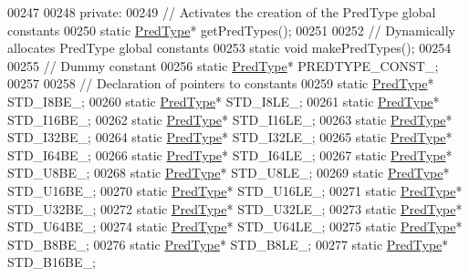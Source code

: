 \begin{DoxyCode}
00247 
00248    \textcolor{keyword}{private}:
00249         \textcolor{comment}{// Activates the creation of the PredType global constants}
00250         \textcolor{keyword}{static} \hyperlink{class_h5_1_1_pred_type}{PredType}* getPredTypes();
00251 
00252         \textcolor{comment}{// Dynamically allocates PredType global constants}
00253         \textcolor{keyword}{static} \textcolor{keywordtype}{void} makePredTypes();
00254 
00255         \textcolor{comment}{// Dummy constant}
00256         \textcolor{keyword}{static} \hyperlink{class_h5_1_1_pred_type}{PredType}* PREDTYPE\_CONST\_;
00257 
00258         \textcolor{comment}{// Declaration of pointers to constants}
00259         \textcolor{keyword}{static} \hyperlink{class_h5_1_1_pred_type}{PredType}* STD\_I8BE\_;
00260         \textcolor{keyword}{static} \hyperlink{class_h5_1_1_pred_type}{PredType}* STD\_I8LE\_;
00261         \textcolor{keyword}{static} \hyperlink{class_h5_1_1_pred_type}{PredType}* STD\_I16BE\_;
00262         \textcolor{keyword}{static} \hyperlink{class_h5_1_1_pred_type}{PredType}* STD\_I16LE\_;
00263         \textcolor{keyword}{static} \hyperlink{class_h5_1_1_pred_type}{PredType}* STD\_I32BE\_;
00264         \textcolor{keyword}{static} \hyperlink{class_h5_1_1_pred_type}{PredType}* STD\_I32LE\_;
00265         \textcolor{keyword}{static} \hyperlink{class_h5_1_1_pred_type}{PredType}* STD\_I64BE\_;
00266         \textcolor{keyword}{static} \hyperlink{class_h5_1_1_pred_type}{PredType}* STD\_I64LE\_;
00267         \textcolor{keyword}{static} \hyperlink{class_h5_1_1_pred_type}{PredType}* STD\_U8BE\_;
00268         \textcolor{keyword}{static} \hyperlink{class_h5_1_1_pred_type}{PredType}* STD\_U8LE\_;
00269         \textcolor{keyword}{static} \hyperlink{class_h5_1_1_pred_type}{PredType}* STD\_U16BE\_;
00270         \textcolor{keyword}{static} \hyperlink{class_h5_1_1_pred_type}{PredType}* STD\_U16LE\_;
00271         \textcolor{keyword}{static} \hyperlink{class_h5_1_1_pred_type}{PredType}* STD\_U32BE\_;
00272         \textcolor{keyword}{static} \hyperlink{class_h5_1_1_pred_type}{PredType}* STD\_U32LE\_;
00273         \textcolor{keyword}{static} \hyperlink{class_h5_1_1_pred_type}{PredType}* STD\_U64BE\_;
00274         \textcolor{keyword}{static} \hyperlink{class_h5_1_1_pred_type}{PredType}* STD\_U64LE\_;
00275         \textcolor{keyword}{static} \hyperlink{class_h5_1_1_pred_type}{PredType}* STD\_B8BE\_;
00276         \textcolor{keyword}{static} \hyperlink{class_h5_1_1_pred_type}{PredType}* STD\_B8LE\_;
00277         \textcolor{keyword}{static} \hyperlink{class_h5_1_1_pred_type}{PredType}* STD\_B16BE\_;

\end{DoxyCode}

